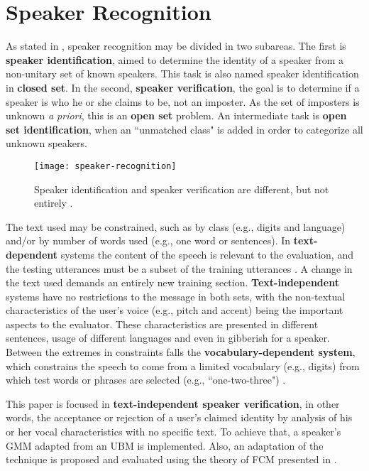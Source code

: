 \section{Speaker Recognition}
\label{sec:speaker-recognition}

As stated in \cite{reynolds.campbell.2008}, speaker recognition may be divided in two subareas. The first is \textbf{speaker identification}, aimed to determine the identity of a speaker from a non-unitary set of known speakers. This task is also named speaker identification in \textbf{closed set}. In the second, \textbf{speaker verification}, the goal is to determine if a speaker is who he or she claims to be, not an imposter. As the set of imposters is unknown \emph{a priori}, this is an \textbf{open set} problem. An intermediate task is \textbf{open set identification}, when an ``unmatched class" is added in order to categorize all unknown speakers.

\begin{figure}[ht]
    \centering
    \texttt{[image: speaker-recognition]}
    \caption{Speaker identification and speaker verification are different, but not entirely \cite{reynolds.1995}.}
    \label{fig:speaker-recognition}
\end{figure}

The text used may be constrained, such as by class (e.g., digits and language) and/or by number of words used (e.g., one word or sentences). In \textbf{text-dependent} systems the content of the speech is relevant to the evaluation, and the testing utterances must be a subset of the training utterances \cite{hebert.2008}. A change in the text used demands an entirely new training section. \textbf{Text-independent} systems have no restrictions to the message in both sets, with the non-textual characteristics of the user's voice (e.g., pitch and accent) being the important aspects to the evaluator. These characteristics are presented in different sentences, usage of different languages and even in gibberish for a speaker. Between the extremes in constraints falls the \textbf{vocabulary-dependent system}, which constrains the speech to come from a limited vocabulary (e.g., digits) from which test words or phrases are selected (e.g., ``one-two-three") \cite{reynolds.1995}.

This paper is focused in \textbf{text-independent speaker verification}, in other words, the acceptance or rejection of a user's claimed identity by analysis of his or her vocal characteristics with no specific text. To achieve that, a speaker's GMM adapted from an UBM \cite{reynolds.quatieri.dunn.2000} is implemented. Also, an adaptation of the technique is proposed and evaluated using the theory of FCM presented in \cite{gao.zhou.pu.2013}.

